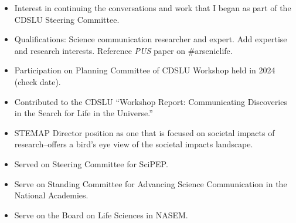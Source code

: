 \documentclass[12pt]{article}
\begin{document}
\begin{itemize}
    \item Interest in continuing the conversations and work that I began as part of the CDSLU Steering Committee.
    \item Qualifications: Science communication researcher and expert. Add expertise and research interests. Reference \textit{PUS} paper on \#arseniclife.
    \item Participation on Planning Committee of CDSLU Workshop held in 2024 (check date).
    \item Contributed to the CDSLU ``Workshop Report: Communicating Discoveries in the Search for Life in the Universe.''
    \item STEMAP Director position as one that is focused on societal impacts of research--offers a bird's eye view of the societal impacts landscape.
    \item Served on Steering Committee for SciPEP.
    \item Serve on Standing Committee for Advancing Science Communication in the National Academies.
    \item Serve on the Board on Life Sciences in NASEM.
\end{itemize}

\newpage

\printbibliography
\end{document}
